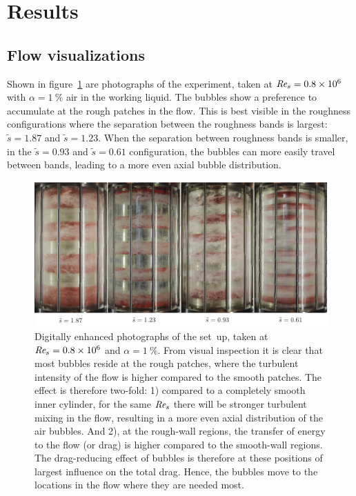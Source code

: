 \documentclass[aps,twocolumn,10pt,floatfix, superscriptaddress,longbibliography,pra]{revtex4-1}
\newcommand\Rey{\mbox{\textit{Re$_s$}}}  %
\newcommand{\perc}[1]{ \SI{#1}{\percent} }
\newcommand{\e}[1]{\times 10^{#1}}
\begin{document}
\section{Results}

\subsection{Flow visualizations}
Shown in figure~\ref{fig:bubbles_photos} are photographs of the experiment, taken at $\Rey = 0.8\e{6}$ with $\alpha = \perc{1}$ air in the working liquid. The bubbles show a preference to accumulate at the rough patches in the flow. This is best visible in the roughness configurations where the separation between the roughness bands is largest: $\tilde{s} = 1.87$ and $\tilde{s} = 1.23$. When the separation between roughness bands is smaller, in the $\tilde{s} = 0.93$ and $\tilde{s} = 0.61$ configuration, the bubbles can more easily travel between bands, leading to a more even axial bubble distribution.

\begin{figure}
\centering
\includegraphics[scale=1]{./figures/fig3_bubbles_photos}
\caption{Digitally enhanced photographs of the set~up, taken at $\Rey = 0.8\e{6}$ and $\alpha = \perc{1} $. From visual inspection it is clear that most bubbles reside at the rough patches, where the turbulent intensity of the flow is higher compared to the smooth patches. The effect is therefore two-fold: 1) compared to a completely smooth inner cylinder, for the same $\Rey$ there will be stronger turbulent mixing in the flow, resulting in a more even axial distribution of the air bubbles. And 2), at the rough-wall regions, the transfer of energy to the flow (or drag) is higher compared to the smooth-wall regions. The drag-reducing effect of bubbles is therefore at these positions of largest influence on the total drag. Hence, the bubbles move to the locations in the flow where they are needed most.}\label{fig:bubbles_photos}
\end{figure}
\end{document}

